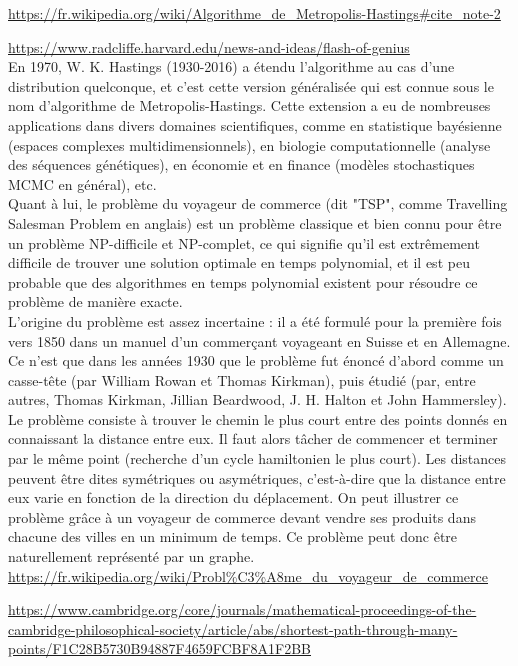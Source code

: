 \documentclass{article}
\begin{document}
\url{https://fr.wikipedia.org/wiki/Algorithme_de_Metropolis-Hastings#cite_note-2}

\url{https://www.radcliffe.harvard.edu/news-and-ideas/flash-of-genius} \\

En 1970, W. K. Hastings (1930-2016) a étendu l'algorithme au cas d'une distribution quelconque, et c'est cette version généralisée qui est connue sous le nom d'algorithme de Metropolis-Hastings. Cette extension a eu de nombreuses applications dans divers domaines scientifiques, comme en statistique bayésienne (espaces complexes multidimensionnels), en biologie computationnelle (analyse des séquences génétiques), en économie et en finance (modèles stochastiques MCMC en général), etc. \\

Quant à lui, le problème du voyageur de commerce (dit "TSP", comme Travelling Salesman Problem en anglais) est un problème classique et bien connu pour être un problème NP-difficile et NP-complet, ce qui signifie qu'il est extrêmement difficile de trouver une solution optimale en temps polynomial, et il est peu probable que des algorithmes en temps polynomial existent pour résoudre ce problème de manière exacte. \\
L'origine du problème est assez incertaine : il a été formulé pour la première fois vers 1850 dans un manuel d'un commerçant voyageant en Suisse et en Allemagne. Ce n'est que dans les années 1930 que le problème fut énoncé d'abord comme un casse-tête (par William Rowan et Thomas Kirkman), puis étudié (par, entre autres, Thomas Kirkman, Jillian Beardwood, J. H. Halton et John Hammersley). \\ 
Le problème consiste à trouver le chemin le plus court entre des points donnés en connaissant la distance entre eux. Il faut alors tâcher de commencer et terminer par le même point (recherche d'un cycle hamiltonien le plus court). Les distances peuvent être dites symétriques ou asymétriques, c'est-à-dire que la distance entre eux varie en fonction de la direction du déplacement. On peut illustrer ce problème grâce à un voyageur de commerce devant vendre ses produits dans chacune des villes en un minimum de temps. Ce problème peut donc être naturellement représenté par un graphe.\\

\url{https://fr.wikipedia.org/wiki/Probl\%C3\%A8me_du_voyageur_de_commerce}

\url{https://www.cambridge.org/core/journals/mathematical-proceedings-of-the-cambridge-philosophical-society/article/abs/shortest-path-through-many-points/F1C28B5730B94887F4659FCBF8A1F2BB} %
\end{document}
